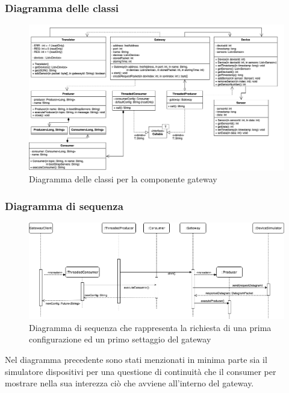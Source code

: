 		\begin{landscape}
	\subsubsection{Diagramma delle classi}%
	  	\begin{figure}[H]
			\centering
			\includegraphics[scale=0.500]{res/images/GATEWAY/ClassiGateway.png}
			\caption{Diagramma delle classi per la componente gateway}
		\end{figure}	
		\end{landscape}
		\begin{landscape}
	\subsubsection{Diagramma di sequenza}
	  	\begin{figure}[H]
			\centering
			\includegraphics[scale=0.500]{res/images/GATEWAY/RichiestaInvioGateway.png}
			\caption{Diagramma di sequenza che rappresenta la richiesta di una prima configurazione ed un primo settaggio del gateway}
		\end{figure}
		
		Nel diagramma precedente sono stati menzionati in minima parte sia il simulatore dispositivi per una questione di continuità che il consumer per mostrare nella sua interezza ciò che avviene all'interno del gateway.
		\end{landscape}
